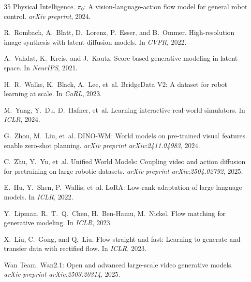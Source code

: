 \documentclass{article}
\begin{document}
\begin{thebibliography}{35}
Physical Intelligence.
\newblock $\pi_0$: A vision-language-action flow model for general robot control.
\newblock \emph{arXiv preprint}, 2024.

R.~Rombach, A.~Blatt, D.~Lorenz, P.~Esser, and B.~Ommer.
\newblock High-resolution image synthesis with latent diffusion models.
\newblock In \emph{CVPR}, 2022.

A.~Vahdat, K.~Kreis, and J.~Kautz.
\newblock Score-based generative modeling in latent space.
\newblock In \emph{NeurIPS}, 2021.

H.~R.~Walke, K.~Black, A.~Lee, et~al.
\newblock BridgeData V2: A dataset for robot learning at scale.
\newblock In \emph{CoRL}, 2023.

M.~Yang, Y.~Du, D.~Hafner, et~al.
\newblock Learning interactive real-world simulators.
\newblock In \emph{ICLR}, 2024.

G.~Zhou, M.~Liu, et~al.
\newblock DINO-WM: World models on pre-trained visual features enable zero-shot planning.
\newblock \emph{arXiv preprint arXiv:2411.04983}, 2024.

C.~Zhu, Y.~Yu, et~al.
\newblock Unified World Models: Coupling video and action diffusion for pretraining on large robotic datasets.
\newblock \emph{arXiv preprint arXiv:2504.02792}, 2025.

E.~Hu, Y.~Shen, P.~Wallis, et~al.
\newblock LoRA: Low-rank adaptation of large language models.
\newblock In \emph{ICLR}, 2022.

Y.~Lipman, R.~T.~Q.~Chen, H.~Ben-Hamu, M.~Nickel.
\newblock Flow matching for generative modeling.
\newblock In \emph{ICLR}, 2023.

X.~Liu, C.~Gong, and Q.~Liu.
\newblock Flow straight and fast: Learning to generate and transfer data with rectified flow.
\newblock In \emph{ICLR}, 2023.

Wan Team.
\newblock Wan2.1: Open and advanced large-scale video generative models.
\newblock \emph{arXiv preprint arXiv:2503.20314}, 2025.

\end{thebibliography}
\end{document}
